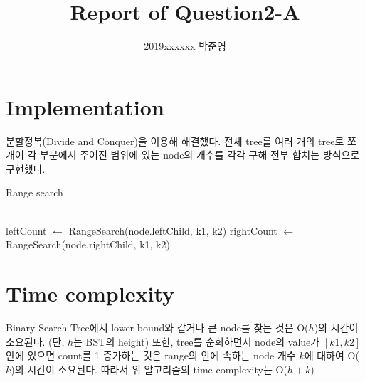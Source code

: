 \documentclass[a4paper, 11pt]{article}
\title{Report of Question2-A}
\author{2019xxxxxx 박준영}
\date{}
\begin{document}
\maketitle

\section{Implementation}
분할정복(Divide and Conquer)을 이용해 해결했다. 전체 tree를 여러 개의 tree로 쪼개어 각 부분에서 주어진 범위에 있는 node의 개수를 각각 구해 전부 합치는 방식으로 구현했다.

\begin{algorithm}
	\caption{Range search}
	\begin{algorithmic}
				\State {}
			\EndIf\\
						
				\State leftCount $\gets$ RangeSearch(node.leftChild, k1, k2)
				\State rightCount $\gets$ RangeSearch(node.rightChild, k1, k2)
				\State {}
				\State {}
			\Else
				\State {}
			\EndIf
		\EndFunction
	\end{algorithmic}
\end{algorithm}

\section{Time complexity}
Binary Search Tree에서 lower bound와 같거나 큰 node를 찾는 것은 O($h$)의 시간이 소요된다. (단, $h$는 BST의 height) 또한, tree를 순회하면서 node의 value가 $[k1,k2]$ 안에 있으면 count를 1 증가하는 것은 range의 안에 속하는 node 개수 $k$에 대하여 O($k$)의 시간이 소요된다. 따라서 위 알고리즘의 time complexity는 O($h+k$)
\end{document}
